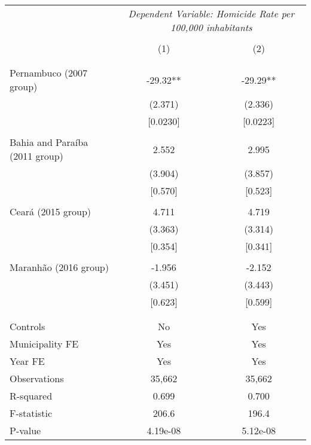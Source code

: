 \documentclass[]{article}
\begin{document}
\begin{table}[htbp]
\centering
\begin{tabular}{lcc} \hline\hline
& \multicolumn{2}{c}{\textit{Dependent Variable: Homicide Rate per 100,000 inhabitants}} \\
\cline{2-3} \\
& (1) & (2) \\ \\ \hline
 &  &  \\
Pernambuco (2007 group) & -29.32** & -29.29** \\
 & (2.371) & (2.336) \\
 & [0.0230] & [0.0223] \\\\
Bahia and Paraíba (2011 group) & 2.552 & 2.995 \\
 & (3.904) & (3.857) \\
 & [0.570] & [0.523] \\\\
Ceará (2015 group) & 4.711 & 4.719 \\
 & (3.363) & (3.314) \\
 & [0.354] & [0.341] \\\\
Maranhão (2016 group) & -1.956 & -2.152 \\
 & (3.451) & (3.443) \\
 & [0.623] & [0.599] \\\\
 &  &  \\
\hline
Controls & No & Yes \\
Municipality FE & Yes & Yes \\
Year FE & Yes & Yes \\
Observations & 35,662 & 35,662 \\
R-squared & 0.699 & 0.700 \\
F-statistic & 206.6 & 196.4 \\
P-value & 4.19e-08 & 5.12e-08 \\
\hline\hline
\end{tabular}
\end{table}
\end{document}
